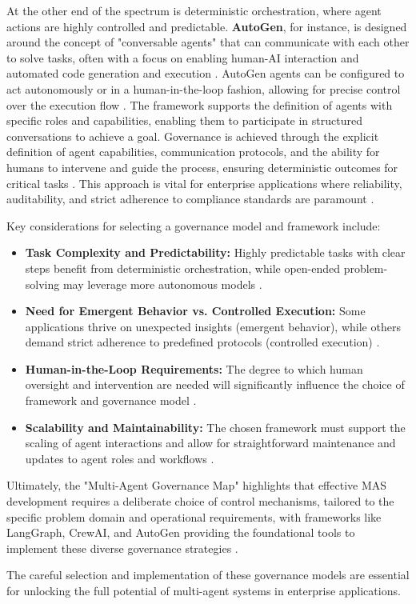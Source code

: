 At the other end of the spectrum is deterministic orchestration, where agent actions are highly controlled and predictable. \textbf{AutoGen}, for instance, is designed around the concept of "conversable agents" that can communicate with each other to solve tasks, often with a focus on enabling human-AI interaction and automated code generation and execution \cite{AutoGenDocs}. AutoGen agents can be configured to act autonomously or in a human-in-the-loop fashion, allowing for precise control over the execution flow \cite{Reger2026}. The framework supports the definition of agents with specific roles and capabilities, enabling them to participate in structured conversations to achieve a goal. Governance is achieved through the explicit definition of agent capabilities, communication protocols, and the ability for humans to intervene and guide the process, ensuring deterministic outcomes for critical tasks \cite{Gartner2025}. This approach is vital for enterprise applications where reliability, auditability, and strict adherence to compliance standards are paramount \cite{Reger2026}.

Key considerations for selecting a governance model and framework include:

\begin{itemize}
  \item \textbf{Task Complexity and Predictability:} Highly predictable tasks with clear steps benefit from deterministic orchestration, while open-ended problem-solving may leverage more autonomous models \cite{Reger2026}.
  \item \textbf{Need for Emergent Behavior vs. Controlled Execution:} Some applications thrive on unexpected insights (emergent behavior), while others demand strict adherence to predefined protocols (controlled execution) \cite{Gartner2025}.
  \item \textbf{Human-in-the-Loop Requirements:} The degree to which human oversight and intervention are needed will significantly influence the choice of framework and governance model \cite{Reger2026}.
  \item \textbf{Scalability and Maintainability:} The chosen framework must support the scaling of agent interactions and allow for straightforward maintenance and updates to agent roles and workflows \cite{Gartner2025}.
\end{itemize}

Ultimately, the "Multi-Agent Governance Map" highlights that effective MAS development requires a deliberate choice of control mechanisms, tailored to the specific problem domain and operational requirements, with frameworks like LangGraph, CrewAI, and AutoGen providing the foundational tools to implement these diverse governance strategies \cite{Reger2026}.

The careful selection and implementation of these governance models are essential for unlocking the full potential of multi-agent systems in enterprise applications.
